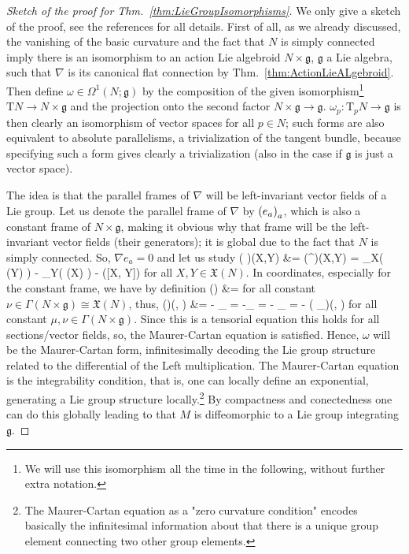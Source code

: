 \begin{proof}[Sketch of the proof for Thm.~\ref{thm:LieGroupIsomorphisms}]
\leavevmode\newline
We only give a sketch of the proof, see the references for all details. First of all, as we already discussed, the vanishing of the basic curvature and the fact that $N$ is simply connected imply there is an isomorphism to an action Lie algebroid $N \times \mathfrak{g}$, $\mathfrak{g}$ a Lie algebra, such that $\nabla$ is its canonical flat connection by Thm.~\ref{thm:ActionLieALgebroid}. Then define $\omega \in \Omega^1(N; \mathfrak{g})$ by the composition of the given isomorphism\footnote{We will use this isomorphism all the time in the following, without further extra notation.} $\mathrm{T}N \to N \times \mathfrak{g}$ and the projection onto the second factor $N \times \mathfrak{g} \to \mathfrak{g}$. $\omega_p: \mathrm{T}_pN \to \mathfrak{g}$ is then clearly an isomorphism of vector spaces for all $p \in N$; such forms are also equivalent to absolute parallelisms, a trivialization of the tangent bundle, because specifying such a form gives clearly a trivialization (also in the case if $\mathfrak{g}$ is just a vector space). 

The idea is that the parallel frames of $\nabla$ will be left-invariant vector fields of a Lie group. Let us denote the parallel frame of $\nabla$ by $\mleft( e_a \mright)_a$, which is also a constant frame of $N \times \mathfrak{g}$, making it obvious why that frame will be the left-invariant vector fields (their generators); it is global due to the fact that $N$ is simply connected. So, $\nabla e_a = 0$ and
let us study
\bas
\mleft( \omega\mright)(X,Y)
&=
\mleft(^\nabla \omega\mright)(X,Y)
=
\nabla_X\bigl( \omega(Y) \bigr)
	- \nabla_Y\bigl( \omega(X) \bigr)
	- \omega([X, Y])
\eas
for all $X, Y \in \mathfrak{X}(N)$. In coordinates, especially for the constant frame, we have by definition
\bas
\omega(\nu)
&=
\nu
\eas
for all constant $\nu \in \Gamma(N \times \mathfrak{g}) \cong \mathfrak{X}(N)$,
thus,
\bas
(\omega)(\mu, \nu) 
&= 
- \omega{}_{}
=
-\mleft[ \mu, \nu \mright]_{}
=
- \mleft[ \omega(\mu), \omega(\nu) \mright]_{}
=
- \mleft( \mleft[ \omega \stackrel{\wedge}{,} \omega \mright]_{}\mright)(\mu, \nu)
\eas
for all constant $\mu, \nu \in \Gamma(N \times \mathfrak{g})$. Since this is a tensorial equation this holds for all sections/vector fields, so, the Maurer-Cartan equation is satisfied. Hence, $\omega$ will be the Maurer-Cartan form, infinitesimally decoding the Lie group structure related to the differential of the Left multiplication. The Maurer-Cartan equation is the integrability condition, that is, one can locally define an exponential, generating a Lie group structure locally.\footnote{The Maurer-Cartan equation as a "zero curvature condition" encodes basically the infinitesimal information about that there is a unique group element connecting two other group elements.} By compactness and conectedness one can do this globally leading to that $M$ is diffeomorphic to a Lie group integrating $\mathfrak{g}$.
\end{proof}

